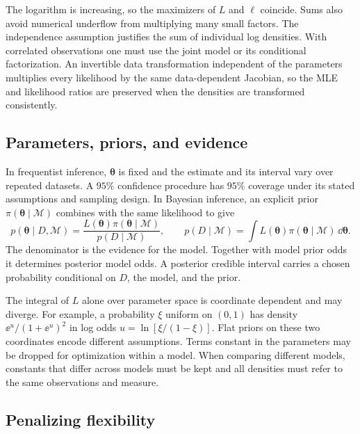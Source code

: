 The logarithm is increasing, so the maximizers of $L$ and $\ell$ coincide. Sums also avoid numerical underflow from multiplying many small factors. The independence assumption justifies the sum of individual log densities. With correlated observations one must use the joint model or its conditional factorization. An invertible data transformation independent of the parameters multiplies every likelihood by the same data-dependent Jacobian, so the MLE and likelihood ratios are preserved when the densities are transformed consistently.

\subsection{Parameters, priors, and evidence}
\label{subsec:l06-bayes}

In frequentist inference, $\boldsymbol\theta$ is fixed and the estimate and its interval vary over repeated datasets. A $95\%$ confidence procedure has $95\%$ coverage under its stated assumptions and sampling design. In Bayesian inference, an explicit prior $\pi(\boldsymbol\theta\mid\mathcal M)$ combines with the same likelihood to give
\begin{equation}
 p(\boldsymbol\theta\mid D,\mathcal M)=
 \frac{L(\boldsymbol\theta)\pi(\boldsymbol\theta\mid\mathcal M)}
 {p(D\mid\mathcal M)},\qquad
 p(D\mid\mathcal M)=\int L(\boldsymbol\theta)
             \pi(\boldsymbol\theta\mid\mathcal M)\,\dd\boldsymbol\theta.
 \label{eq:l06-bayes}
\end{equation}
The denominator is the evidence for the model. Together with model prior odds it determines posterior model odds. A posterior credible interval carries a chosen probability conditional on $D$, the model, and the prior.

The integral of $L$ alone over parameter space is coordinate dependent and may diverge. For example, a probability $\xi$ uniform on $(0,1)$ has density $\ee^u/(1+\ee^u)^2$ in log odds $u=\ln[\xi/(1-\xi)]$. Flat priors on these two coordinates encode different assumptions. Terms constant in the parameters may be dropped for optimization within a model. When comparing different models, constants that differ across models must be kept and all densities must refer to the same observations and measure.

\subsection{Penalizing flexibility}
\label{subsec:l06-aic-bic}

